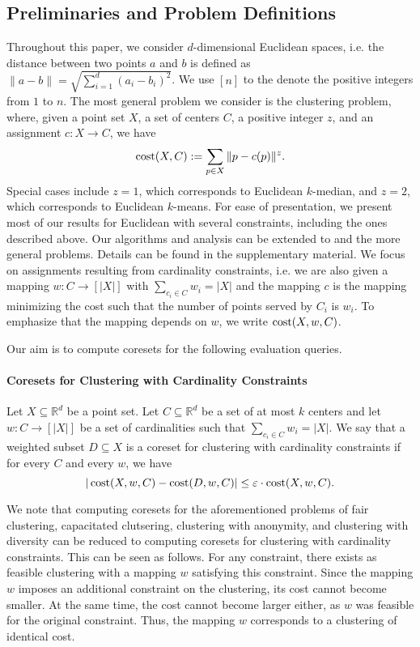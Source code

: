 \subsection{Preliminaries and Problem Definitions}
Throughout this paper, we consider $d$-dimensional Euclidean spaces, i.e. the distance between two points $a$ and $b$ is defined as $\|a-b\| = \sqrt{\sum_{i=1}^d (a_i-b_i)^2}$. We use $[n]$ to the denote the positive integers from $1$ to $n$.
The most general problem we consider is the \kzC clustering problem, where, given a point set $X$, a set of centers $C$, a positive integer $z$, and an assignment $c:X\rightarrow C$, we have
$$\operatorname{cost}(X,C) := \sum_{p\in X} \|p-c(p)\|^z.$$
Special cases include $z=1$, which corresponds to Euclidean $k$-median, and $z=2$, which corresponds to Euclidean $k$-means.
For ease of presentation, we present most of our results for Euclidean \kMedian with several constraints, including the ones described above. Our algorithms and analysis can be extended to \kMeans and the more general \kzC problems. Details can be found in the supplementary material.
We focus on assignments resulting from cardinality constraints, i.e. we are also given a mapping $w:C\rightarrow [|X|]$ with $\sum_{c_i\in C} w_i = |X|$ and the mapping $c$ is the mapping minimizing the cost such that the number of points served by $C_i$ is $w_i$. To emphasize that the mapping depends on $w$, we write $\operatorname{cost}(X,w,C)$.

Our aim is to compute coresets for the following evaluation queries.
\paragraph{Coresets for Clustering with Cardinality Constraints}
Let $X\subseteq \mathbb{R}^d$ be a point set. Let $C\subseteq \mathbb{R}^d$ be a set of at most $k$ centers and let $w:C\rightarrow [|X|]$ be a set of cardinalities such that $\sum_{c_i\in C} w_i = |X|$. We say that a weighted subset $D\subseteq X$ is a coreset for clustering with cardinality constraints if for every $C$ and every $w$, we have
$$ |\operatorname{cost}(X,w,C) - \operatorname{cost}(D,w,C)| \leq \varepsilon\cdot \operatorname{cost}(X,w,C).$$

We note that computing coresets for the aforementioned problems of fair clustering, capacitated clutsering, clustering with anonymity, and clustering with diversity can be  reduced to computing coresets for clustering with cardinality constraints.
This can be seen as follows. For any constraint, there exists as feasible clustering with a mapping $w$ satisfying this constraint. Since the mapping $w$ imposes an additional constraint on the clustering, its cost cannot become smaller. At the same time, the cost cannot become larger either, as $w$ was feasible for the original constraint. Thus, the mapping $w$ corresponds to a clustering of identical cost.

